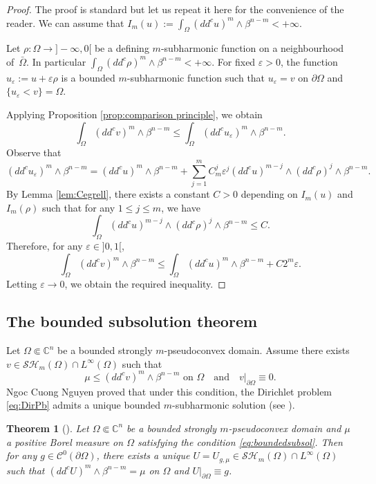 \documentclass[11pt]{article}
\providecommand{\C}{}
\numberwithin{equation}{section}
\let\epsilon\varepsilon
\newtheorem{theorem}{Theorem}[section]
\theoremstyle{definition}
\renewcommand{\C}{\mathbb{C}}
\newcommand{\Cc}{\mathcal{C}}
\theoremstyle{plain}
\theoremstyle{definition}
\begin{document}
\begin{proof} The proof is standard but let us repeat it here for the convenience of the reader.
We can assume that $I_m (u):= \int_{\Omega}(dd^c u)^m\wedge\beta^{n-m} < + \infty$.

Let $\rho: \Omega \to{} ]- \infty,0[$ be a defining $m$-subharmonic function on a neighbourhood of~$\bar \Omega$. In particular $\int_{\Omega}(dd^c \rho)^m\wedge\beta^{n-m} < + \infty$.
For fixed $\varepsilon > 0$, the function $u_\varepsilon:= u + \varepsilon \rho$ is a bounded $m$-subharmonic function such that $u_\varepsilon = v$ on $\partial \Omega$ and $\{u_\varepsilon < v\} = \Omega$.

Applying Proposition \ref{prop:comparison principle}, we obtain
\[
\int_{\Omega}(dd^c v)^m\wedge\beta^{n-m} \leq \int_{\Omega}(dd^c u_\varepsilon)^m\wedge\beta^{n-m}.
\]
Observe that
\[
(dd^c u_\varepsilon)^m\wedge\beta^{n-m} = (dd^c u)^m\wedge\beta^{n-m} + \sum_{j = 1}^m C_m^j \varepsilon^j (dd^c u)^{m - j} \wedge (dd^c \rho)^j \wedge \beta^{n -m}.
\]
By Lemma \ref{lem:Cegrell}, there exists a constant $C > 0 $ depending on $I_m (u)$ and $I_m (\rho)$ such that for any $1 \leq j \leq m$, we have
\[
\int_\Omega (dd^c u)^{m - j} \wedge (dd^c \rho)^j \wedge \beta^{n -m} \leq C.
\]
Therefore, for any $\epsilon\in{}]0,1[$,
\[
\int_{\Omega}(dd^c v)^m\wedge\beta^{n-m} \leq \int_{\Omega}(dd^c u)^m\wedge\beta^{n-m} + C 2^m \varepsilon.
\]
Letting $\varepsilon \to 0$, we obtain the required inequality.
\end{proof}

\subsection{The bounded subsolution theorem}

Let $\Omega \Subset \C^n$ be a bounded strongly $m$\nobreakdash-pseudoconvex domain. Assume there exists $v \in \mathcal{SH}_m (\Omega)\cap L^{\infty} (\Omega)$ such that
\begin{equation} \label{eq:boundedsubsol}
\mu \leq (dd^c v)^m \wedge \beta^{n -m} \text{ on } \Omega \quad\text{and}\quad v|_{\partial \Omega} \equiv 0.
\end{equation}
Ngoc Cuong Nguyen proved that under this condition, the Dirichlet problem \eqref{eq:DirPb} admits a unique bounded $m$-subharmonic solution (see \cite{N13}).

\begin{theorem}[\cite{N13}] \label{thm:boundedsubsolution}Let $\Omega \Subset \C^n$ be a bounded strongly $m$-pseudoconvex domain and $\mu$ a positive Borel measure on $\Omega$ satisfying the condition \eqref{eq:boundedsubsol}. Then for any $g \in \Cc^0 (\partial \Omega)$, there exists a unique $U = U_{g,\mu} \in \mathcal{SH}_m (\Omega)\cap L^{\infty} (\Omega)$ such that $(dd^c U)^m \wedge \beta^{n -m} = \mu$ on $\Omega$ and $U|_{\partial \Omega} \equiv g$.
\end{theorem}
\end{document}
